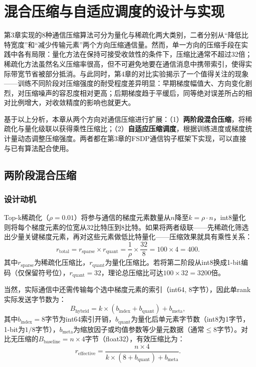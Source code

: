 
\chapter{混合压缩与自适应调度的设计与实现}

第3章实现的8种通信压缩算法可分为量化与稀疏化两大类别，二者分别从``降低比特宽度''和``减少传输元素''两个方向压缩通信量。然而，单一方向的压缩手段在实践中各有局限：量化方法在保持可接受收敛性的条件下，压缩比通常不超过32倍；稀疏化方法虽然名义压缩率很高，但不可避免地要在通信消息中携带索引，使得实际带宽节省被部分抵消。与此同时，第4章的对比实验揭示了一个值得关注的现象——训练不同阶段对压缩强度的耐受程度差异明显：早期梯度幅值大、方向变化剧烈，对压缩噪声的容忍度相对更高；后期梯度趋于平缓后，同等绝对误差所占的相对比例增大，对收敛精度的影响也就更大。

基于以上分析，本章从两个方向对通信压缩进行扩展：（1）\textbf{两阶段混合压缩}，将稀疏化与量化级联以获得乘性压缩比；（2）\textbf{自适应压缩调度}，根据训练进度或梯度统计量动态调整压缩强度。两者都在第3章的FSDP通信钩子框架下实现，可以直接与已有算法配合使用。

\section{两阶段混合压缩}

\subsection{设计动机}

Top-k稀疏化（\(\rho=0.01\)）将参与通信的梯度元素数量从\(n\)降至\(k = \rho \cdot n\)，int8量化则将每个梯度元素的位宽从32比特压到8比特。如果将两者级联——先稀疏化筛选出少量关键梯度元素，再对这些元素做低比特量化——压缩效果就具有乘性关系：
\begin{equation}
r_{\text{total}} = r_{\text{sparse}} \times r_{\text{quant}} = \frac{1}{\rho} \times \frac{32}{8} = 100 \times 4 = 400.
\label{eq:hybrid-ratio}
\end{equation}
其中\(r_{\text{sparse}}\)为稀疏化压缩比，\(r_{\text{quant}}\)为量化压缩比。若将第二阶段从int8换成1-bit编码（仅保留符号位），\(r_{\text{quant}} = 32\)，理论总压缩比可达\(100 \times 32 = 3200\)倍。

当然，实际通信中还需传输每个选中梯度元素的索引（int64, 8字节），因此单rank实际发送字节数为：
\begin{equation}
B_{\text{hybrid}} = k \times (b_{\text{index}} + b_{\text{quant}}) + b_{\text{meta}},
\label{eq:hybrid-bytes}
\end{equation}
其中\(b_{\text{index}}=8\)字节为int64索引开销，\(b_{\text{quant}}\)为量化后单元素字节数（int8为1字节，1-bit为\(1/8\)字节），\(b_{\text{meta}}\)为缩放因子或均值参数等少量元数据（通常\(\le 8\)字节）。对比无压缩的\(B_{\text{baseline}} = n \times 4\)字节（float32），有效压缩比为：
\begin{equation}
r_{\text{effective}} = \frac{n \times 4}{k \times (8 + b_{\text{quant}}) + b_{\text{meta}}}.
\label{eq:hybrid-effective}
\end{equation}

